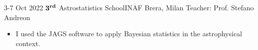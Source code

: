 %
%
%


\begin{experiences}
  \experiencelink
    {3-7 Oct 2022}   {$\bm{3^{\rm rd}}$ Astrostatistics School}{INAF Brera, Milan}{}
    {} {Teacher: Prof. Stefano Andreon}{
    \begin{itemize}
        \item I used the JAGS software to apply Bayesian statistics in the astrophysical context.
    \end{itemize}
    }
\end{experiences}